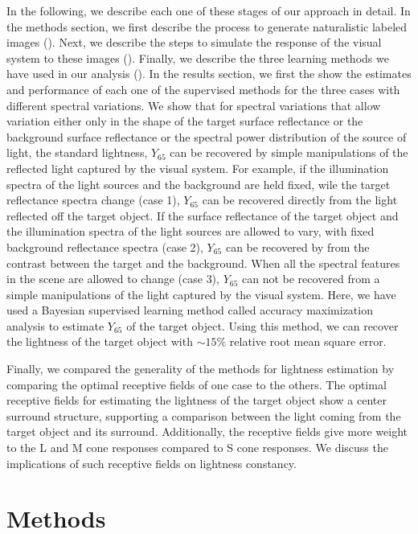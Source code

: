 \documentclass{jov}
\begin{document}
In the following, we describe each one of these stages of our approach in detail. In the methods section, we first describe the process to generate naturalistic labeled images (). Next, we describe the steps to simulate the response of the visual system to these images (). Finally, we describe the three learning methods we have used in our analysis (). In the results section, we first the show the estimates and performance of each one of the supervised methods for the three cases with different spectral variations. We show that for spectral variations that allow variation either only in the shape of the target surface reflectance or the background surface reflectance or the spectral power distribution of the source of light, the standard lightness, $Y_{65}$ can be recovered by simple manipulations of the reflected light captured by the visual system. For example, if the illumination spectra of the light sources and the background are held fixed, wile the target reflectance spectra change (case 1), $Y_{65}$ can be recovered directly from the light reflected off the target object. If  the surface reflectance of the target object  and the illumination spectra of the light sources are allowed to vary, with fixed background reflectance spectra (case 2), $Y_{65}$ can be recovered by from the contrast between the target and the background. When all the spectral features in the scene are allowed to change (case 3), $Y_{65}$ can not be recovered from a simple manipulations of the light captured by the visual system. Here, we have used a Bayesian supervised learning method called accuracy maximization analysis to estimate $Y_{65}$ of the target object. Using this method, we can recover the lightness of the target object with $\sim 15\%$ relative root mean square error.

Finally, we compared the generality of the methods for lightness estimation by comparing the optimal receptive fields of one case to the others. The optimal receptive fields for estimating the lightness of the target object show a center surround structure, supporting a comparison between the light coming from the target object and its surround. Additionally, the receptive fields give more weight to the L and M cone responses compared to S cone responses. We discuss the implications of such receptive fields on lightness constancy. 

\section{Methods}
\end{document}

